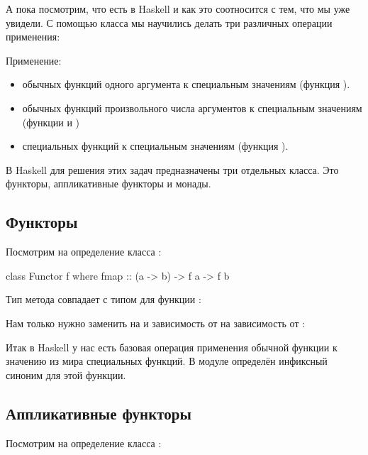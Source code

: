 А пока посмотрим, что есть в Haskell и как это соотносится 
с тем, что мы уже увидели. С помощью класса   
мы научились делать три различных операции применения:

Применение:
\begin{itemize}
\item обычных функций одного аргумента к
        специальным значениям (функция \In{+$}). 

\item обычных функций произвольного числа аргументов к
        специальным значениям (функции \In{+$} и \In{$$})
        
\item специальных функций к специальным значениям
        (функция \In{*$}).

\end{itemize}

В Haskell для решения этих задач предназначены три отдельных
класса. Это функторы, аппликативные функторы и монады. 

\subsection{Функторы}

Посмотрим на определение класса  :

\begin{code}
class Functor f where
    fmap :: (a -> b) -> f a -> f b
\end{code}

Тип метода  совпадает с типом для функции \In{+$}:


Нам только нужно заменить  на  и 
зависимость от  на зависимость от :

Итак в Haskell у нас есть базовая операция 
применения обычной функции к значению из мира 
специальных функций. В модуле 
определён инфиксный синоним \In{<$>} для этой функции.

\subsection{Аппликативные функторы}

Посмотрим на определение класса 
:


